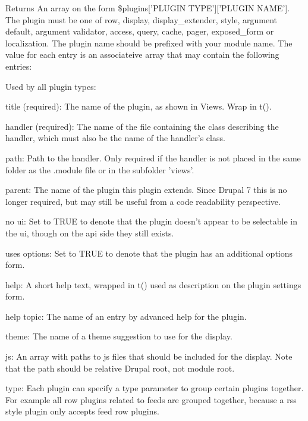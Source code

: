 \begin{DoxyReturn}{Returns}
An array on the form \$plugins\mbox{[}'PLUGIN TYPE'\mbox{]}\mbox{[}'PLUGIN NAME'\mbox{]}. The plugin must be one of row, display, display\_\-extender, style, argument default, argument validator, access, query, cache, pager, exposed\_\-form or localization. The plugin name should be prefixed with your module name. The value for each entry is an associateive array that may contain the following entries:
\begin{DoxyItemize}
\item Used by all plugin types:
\begin{DoxyItemize}
\item title (required): The name of the plugin, as shown in Views. Wrap in t().
\item handler (required): The name of the file containing the class describing the handler, which must also be the name of the handler's class.
\item path: Path to the handler. Only required if the handler is not placed in the same folder as the .module file or in the subfolder 'views'.
\item parent: The name of the plugin this plugin extends. Since Drupal 7 this is no longer required, but may still be useful from a code readability perspective.
\item no ui: Set to TRUE to denote that the plugin doesn't appear to be selectable in the ui, though on the api side they still exists.
\item uses options: Set to TRUE to denote that the plugin has an additional options form.
\item help: A short help text, wrapped in t() used as description on the plugin settings form.
\item help topic: The name of an entry by advanced help for the plugin.
\item theme: The name of a theme suggestion to use for the display.
\item js: An array with paths to js files that should be included for the display. Note that the path should be relative Drupal root, not module root.
\item type: Each plugin can specify a type parameter to group certain plugins together. For example all row plugins related to feeds are grouped together, because a rss style plugin only accepts feed row plugins.
\end{DoxyItemize}
\end{DoxyItemize}
\end{DoxyReturn}

